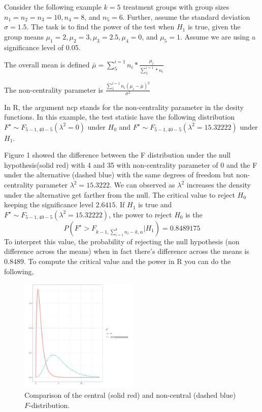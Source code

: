 \documentclass{article}
\begin{document}
Consider the following example $k = 5$ treatment groups with group sizes $n_1 = n_2 = n_3 = 10, n_4 = 8$,
and $n_5 = 6$. Further, assume the standard deviation $\sigma = 1.5$. The task is to find the power of the
test when $H_1$ is true, given the group means $\mu_1 = 2, \mu_2 = 3, \mu_3 = 2.5, \mu_4 = 0$, and $\mu_5 = 1$. Assume
we are using a significance level of 0.05.

The overall mean is defined $\bar{\mu}= \sum_{5}^{i=1}n_i*\frac{\mu_i}{\sum_{5}^{i=1}*n_i}$

The non-centrality parameter is $\frac{\sum_{5}^{i=1}n_i(\mu_i-\bar{\mu})^2}{\sigma^2}$

In R, the argument ncp stands for the non-centrality parameter in the desity functions. In this example, the test statisic
have the following distribution $F^\star \sim F_{5-1,40-5}(\lambda^2=0)$ under $H_0$ and $F^\star \sim F_{5-1,40-5}(\lambda^2 = 15.32222)$ under $H_1$.

Figure 1 showed the difference between the F distribution under the null hypothesis(solid red) with
4 and 35 with non-centrality parameter of 0 and the F under the alternative (dashed blue) with
the same degrees of freedom but non-centrality parameter $\lambda^2 = 15.3222$. We can observed as $\lambda^2$
increases the density under the alternative get farther from the null. The critical value to reject $H_0$
keeping the significance level $2.6415$. If $H_1$ is true and $F^\star \sim F_{5-1,40-5}(\lambda^2 = 15.32222)$, the power
to reject $H_0$ is the
$$
	P(F^\star>F_{k-1,\sum_{i=1}^{k}n_i-k,\alpha}|H_1)=0.8489175
$$
To interpret this value, the probability of rejecting the null hypothesis (non difference across the
means) when in fact there’s difference across the means is $0.8489$. To compute the critical value
and the power in R you can do the following,

\begin{figure}[H]
	\centering
	\includegraphics[width=0.5\textwidth]{assets/prob6.png}
	\caption{Comparison of the central (solid red) and non-central (dashed blue) $F$-distribution.}
\end{figure}
\end{document}
